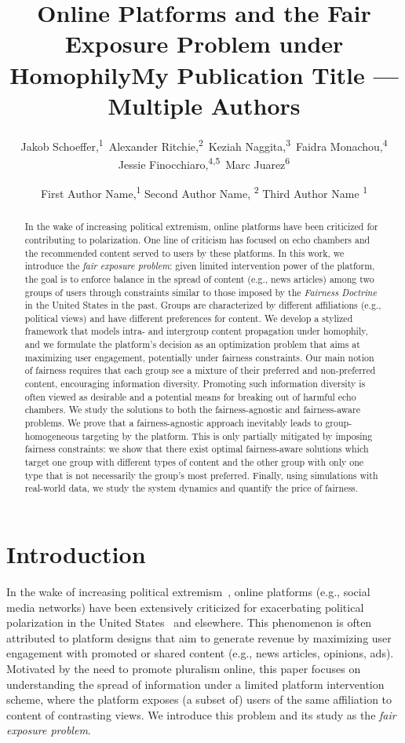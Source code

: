 \documentclass[letterpaper]{article} %
\title{Online Platforms and the Fair Exposure Problem under Homophily}
\author{
    Jakob Schoeffer,\textsuperscript{\rm 1}\equalcontrib\
    Alexander Ritchie,\textsuperscript{\rm 2}\equalcontrib\
    Keziah Naggita,\textsuperscript{\rm 3}\equalcontrib\
    Faidra Monachou,\textsuperscript{\rm 4}\equalcontrib\\
    Jessie Finocchiaro,\textsuperscript{\rm 4,\rm 5}\equalcontrib\
    Marc Juarez\textsuperscript{\rm 6}
}
\title{My Publication Title --- Multiple Authors}
\author {
    First Author Name,\textsuperscript{\rm 1}
    Second Author Name, \textsuperscript{\rm 2}
    Third Author Name \textsuperscript{\rm 1}
}
\begin{document}
\maketitle

\begin{abstract}
    In the wake of increasing political extremism, online platforms have been criticized for contributing to polarization.
    One line of criticism has focused on echo chambers and the recommended content served to users by these platforms.
    In this work, we introduce the \textit{fair exposure problem}: given limited intervention power of the platform, the goal is to enforce balance in the spread of content (e.g., news articles) among two groups of users through constraints similar to those imposed by the \emph{Fairness Doctrine} in the United States in the past.
    Groups are characterized by different affiliations (e.g., political views) and have different preferences for content.
    We develop a stylized framework that models intra- and intergroup content propagation under homophily, and we formulate the platform's decision as an optimization problem that aims at maximizing user engagement, potentially under fairness constraints.
    Our main notion of fairness requires that each group see a mixture of their preferred and non-preferred content, encouraging information diversity.
    Promoting such information diversity is often viewed as desirable and a potential means for breaking out of harmful echo chambers.
    We study the solutions to both the fairness-agnostic and fairness-aware problems. We prove that a fairness-agnostic approach inevitably leads to group-homogeneous targeting  by the platform.
    This is only partially mitigated by imposing fairness constraints: we show that there exist optimal fairness-aware solutions which target one group with different types of content and the other group with only one type that is not necessarily the group's most preferred.
    Finally, using simulations with real-world data, we study the system dynamics and quantify the price of fairness.
\end{abstract}

\section{Introduction}\label{sec:introduction}

In the wake of increasing political extremism~\citep{doj2021riots}, online platforms (e.g., social media networks) have been extensively criticized for exacerbating political polarization in the United States~\citep{boxell2017internet,Bail9216,hawdon2020social,Yarchi2020PoliticalPO} and elsewhere.
This phenomenon is often attributed to platform designs that aim to generate revenue by maximizing user engagement with promoted or shared content (e.g., news articles, opinions, ads).
Motivated by the need to promote pluralism online, this paper focuses on understanding the spread of information under a limited platform intervention scheme, where the platform exposes (a subset of) users of the same affiliation to content of contrasting views.
We introduce this problem and its study as the \textit{fair exposure problem}.
\end{document}
